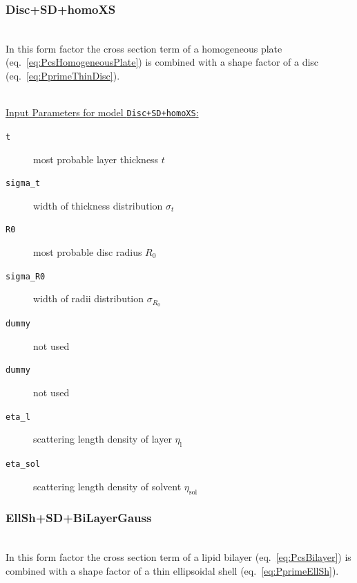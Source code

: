 \vspace{5mm}

\noindent
\subsubsection{Disc+SD+homoXS} ~\\

\noindent
In this form factor the cross section term of a homogeneous plate (eq.\ \ref{eq:PcsHomogeneousPlate}) is combined with a shape factor of a disc (eq.\ \ref{eq:PprimeThinDisc}).

\vspace{5mm}

\hspace{1pt}\\
\underline{Input Parameters for model \texttt{Disc+SD+homoXS}:}\\
\begin{description}
\item[\texttt{t}] most probable layer thickness $t$
\item[\texttt{sigma\_t}] width of thickness distribution $\sigma_t$
\item[\texttt{R0}] most probable disc radius $R_0$
\item[\texttt{sigma\_R0}] width of radii distribution $\sigma_{R_0}$
\item[\texttt{dummy}] not used
\item[\texttt{dummy}] not used
\item[\texttt{eta\_l}] scattering length density of layer $\eta_\mathrm{l}$
\item[\texttt{eta\_sol}] scattering length density of solvent $\eta_\mathrm{sol}$
\end{description}

\vspace{5mm}

\noindent
\subsubsection{EllSh+SD+BiLayerGauss} ~\\

\noindent
In this form factor the cross section term of a lipid bilayer (eq.\ \ref{eq:PcsBilayer}) is combined with a shape factor of a thin ellipsoidal shell (eq.\ \ref{eq:PprimeEllSh}).

\vspace{5mm}

